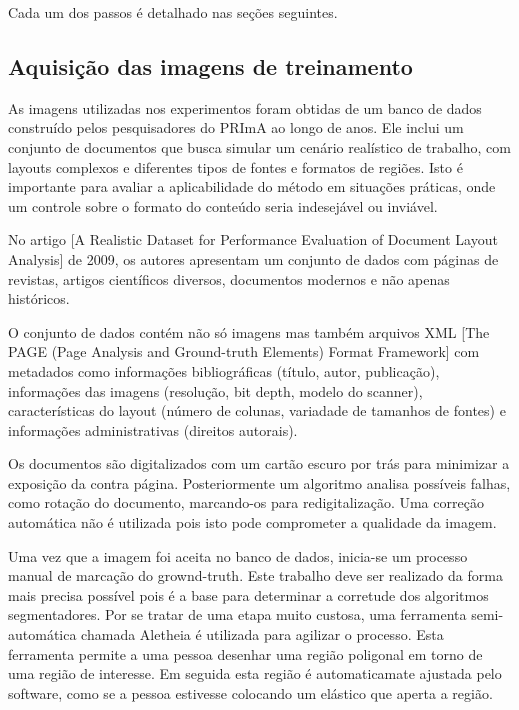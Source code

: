 \documentclass[a4paper,11pt]{article}
\begin{document}
    Cada um dos passos é detalhado nas seções seguintes.

    \subsection{Aquisição das imagens de treinamento}

      As imagens utilizadas nos experimentos foram obtidas de um banco de dados construído pelos pesquisadores do PRImA ao longo de anos. Ele inclui um conjunto de documentos que busca simular um cenário realístico de trabalho, com layouts complexos e diferentes tipos de fontes e formatos de regiões. Isto é importante para avaliar a aplicabilidade do método em situações práticas, onde um controle sobre o formato do conteúdo seria indesejável ou inviável.

      No artigo [A Realistic Dataset for Performance Evaluation of Document Layout Analysis] de 2009, os autores apresentam um conjunto de dados com páginas de revistas, artigos científicos diversos, documentos modernos e não apenas históricos.

      O conjunto de dados contém não só imagens mas também arquivos XML [The PAGE (Page Analysis and Ground-truth Elements) Format Framework] com metadados como informações bibliográficas (título, autor, publicação), informações das imagens (resolução, bit depth, modelo do scanner), características do layout (número de colunas, variadade de tamanhos de fontes) e informações administrativas (direitos autorais).

      Os documentos são digitalizados com um cartão escuro por trás para minimizar a exposição da contra página. Posteriormente um algoritmo analisa possíveis falhas, como rotação do documento, marcando-os para redigitalização. Uma correção automática não é utilizada pois isto pode comprometer a qualidade da imagem.

      Uma vez que a imagem foi aceita no banco de dados, inicia-se um processo manual de marcação do grownd-truth. Este trabalho deve ser realizado da forma mais precisa possível pois é a base para determinar a corretude dos algoritmos segmentadores. Por se tratar de uma etapa muito custosa, uma ferramenta semi-automática chamada Aletheia é utilizada para agilizar o processo. Esta ferramenta permite a uma pessoa desenhar uma região poligonal em torno de uma região de interesse. Em seguida esta região é automaticamate ajustada pelo software, como se a pessoa estivesse colocando um elástico que aperta a região.
\end{document}
